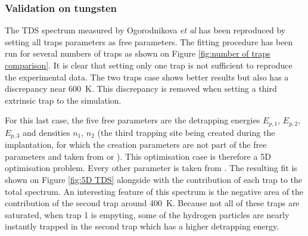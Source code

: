 



\subsubsection{Validation on tungsten}

The TDS spectrum measured by Ogorodnikova \textit{et al}  has been reproduced by setting all traps parameters as free parameters.
The fitting procedure has been run for several numbers of traps as shown on Figure \ref{fig:number of traps comparison}.
It is clear that setting only one trap is not sufficient to reproduce the experimental data.
The two traps case shows better results but also has a discrepancy near \SI{600}{K}.
This discrepancy is removed when setting a third extrinsic trap to the simulation.

For this last case, the five free parameters are the detrapping energies $E_{p, 1}$, $E_{p, 2}$, $E_{p, 3}$ and densities $n_1$, $n_2$ (the third trapping site being created during the implantation, for which the creation parameters are not part of the free parameters and taken from \cite{ogorodnikova_deuterium_2003} or ).
This optimisation case is therefore a 5D optimisation problem.
Every other parameter is taken from \cite{hodille_macroscopic_2015}.
The resulting fit is shown on Figure \ref{fig:5D TDS} alongside with the contribution of each trap to the total spectrum.
An interesting feature of this spectrum is the negative area of the contribution of the second trap around \SI{400}{K}.
Because not all of these traps are saturated, when trap 1 is empyting, some of the hydrogen particles are nearly instantly trapped in the second trap which has a higher detrapping energy.

